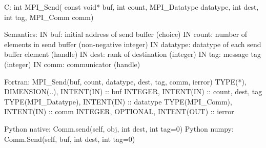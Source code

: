 C:
int MPI_Send(
  const void* buf, int count, MPI_Datatype datatype,
  int dest, int tag, MPI_Comm comm)

Semantics:
IN buf: initial address of send buffer (choice)
IN count: number of elements in send buffer (non-negative integer)
IN datatype: datatype of each send buffer element (handle)
IN dest: rank of destination (integer)
IN tag: message tag (integer)
IN comm: communicator (handle)

Fortran:
MPI_Send(buf, count, datatype, dest, tag, comm, ierror)
TYPE(*), DIMENSION(..), INTENT(IN) :: buf
INTEGER, INTENT(IN) :: count, dest, tag
TYPE(MPI_Datatype), INTENT(IN) :: datatype
TYPE(MPI_Comm), INTENT(IN) :: comm
INTEGER, OPTIONAL, INTENT(OUT) :: ierror 

Python native:
Comm.send(self, obj, int dest, int tag=0)
Python numpy:
Comm.Send(self, buf, int dest, int tag=0)
